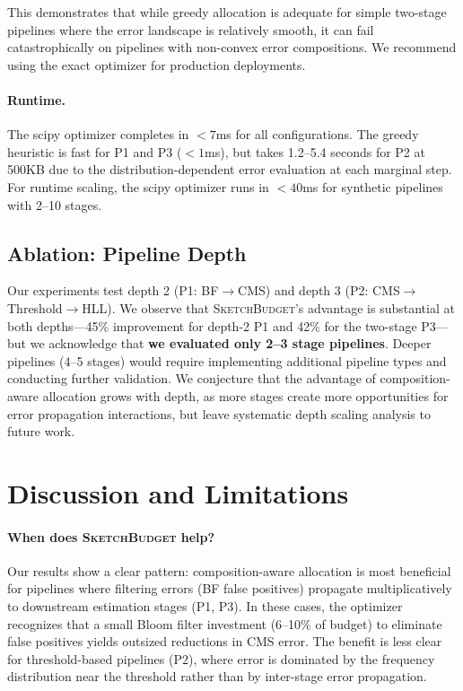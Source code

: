\documentclass[preprint]{article}
\newcommand{\SketchBudget}{\textsc{SketchBudget}}
\begin{document}
This demonstrates that while greedy allocation is adequate for simple two-stage pipelines where the error landscape is relatively smooth, it can fail catastrophically on pipelines with non-convex error compositions. We recommend using the exact optimizer for production deployments.

\paragraph{Runtime.}
The scipy optimizer completes in $<7$ms for all configurations. The greedy heuristic is fast for P1 and P3 ($<1$ms), but takes 1.2--5.4 seconds for P2 at 500KB due to the distribution-dependent error evaluation at each marginal step. For runtime scaling, the scipy optimizer runs in $<40$ms for synthetic pipelines with 2--10 stages.

\subsection{Ablation: Pipeline Depth}

Our experiments test depth 2 (P1: BF$\to$CMS) and depth 3 (P2: CMS$\to$Threshold$\to$HLL). We observe that \SketchBudget{}'s advantage is substantial at both depths---45\% improvement for depth-2 P1 and 42\% for the two-stage P3---but we acknowledge that \textbf{we evaluated only 2--3 stage pipelines}. Deeper pipelines (4--5 stages) would require implementing additional pipeline types and conducting further validation. We conjecture that the advantage of composition-aware allocation grows with depth, as more stages create more opportunities for error propagation interactions, but leave systematic depth scaling analysis to future work.

\section{Discussion and Limitations}
\label{sec:discussion}

\paragraph{When does \SketchBudget{} help?}
Our results show a clear pattern: composition-aware allocation is most beneficial for pipelines where filtering errors (BF false positives) propagate multiplicatively to downstream estimation stages (P1, P3). In these cases, the optimizer recognizes that a small Bloom filter investment (6--10\% of budget) to eliminate false positives yields outsized reductions in CMS error. The benefit is less clear for threshold-based pipelines (P2), where error is dominated by the frequency distribution near the threshold rather than by inter-stage error propagation.
\end{document}
